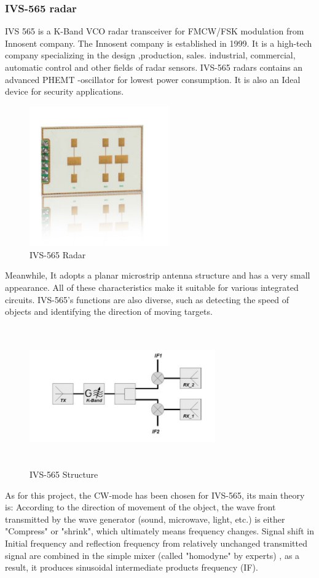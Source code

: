 \subsubsection{IVS-565 radar}
IVS 565 is a K-Band VCO radar transceiver for FMCW/FSK modulation from Innosent company. 
The Innosent company is established in 1999. It is a high-tech company specializing in the design ,production, sales. industrial, commercial, automatic control and other fields of radar sensors.
IVS-565 radars contains an advanced PHEMT -oscillator for lowest power consumption. It is also an Ideal device for security applications. 
\begin{figure}[H]
    \centering
    \includegraphics[width=6cm]{figure/IVS-565Radar.jpg}
    \caption{IVS-565 Radar}
    \label{png_IVS565}
\end{figure}
Meanwhile, It adopts a planar microstrip antenna structure and has a very small appearance. All of these characteristics make it suitable for various integrated circuits. IVS-565’s functions are also diverse, such as detecting the speed of objects and identifying the direction of moving targets.
\begin{figure}[H]
    \centering
    \includegraphics[width=8cm,height=6cm]{figure/IVS-565Structure.jpg}
    \caption{IVS-565 Structure}
\end{figure}
As for this project, the CW-mode has been chosen for IVS-565, its main theory is: According to the direction of movement of the object, the wave front transmitted by the wave generator (sound, microwave, light, etc.) is either "Compress" or "shrink", which ultimately means frequency changes. Signal shift in Initial frequency and reflection frequency from relatively unchanged transmitted signal are combined in the simple mixer (called "homodyne" by experts) , as a result, it produces sinusoidal intermediate products frequency (IF).
